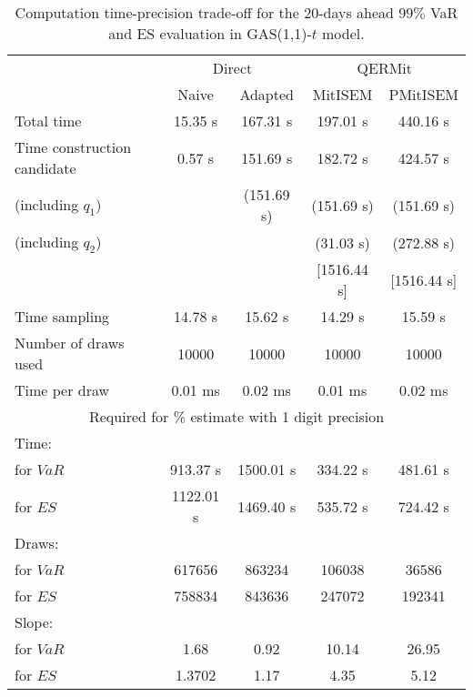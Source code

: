 { \renewcommand{\arraystretch}{1.3} 
\begin{table}[h] 
\centering 
\caption{Computation time-precision trade-off for the 20-days ahead  $99\%$ VaR and ES evaluation in GAS(1,1)-$t$ model.} 
\label{tab:time_precision_t_gas} 
\begin{tabular}{lcccc}  
  & \multicolumn{2}{c}{Direct} & \multicolumn{2}{c}{QERMit}  \\ \cline{2-5} 
  & Naive & Adapted & MitISEM & PMitISEM  \\ \hline 
Total time & 15.35 s & 167.31 s & 197.01 s & 440.16 s \\ 
Time construction candidate & 0.57 s & 151.69 s & 182.72 s & 424.57 s \\ 
 (including $q_{1}$) &   &  (151.69 s) & (151.69 s) & (151.69 s) \\ 
 (including $q_{2}$) &   &  & (31.03 s) & (272.88 s) \\ 
[Initialisation for $q_{2}$]&   &   & [1516.44 s] & [1516.44 s] \\ 
Time sampling & 14.78 s & 15.62 s & 14.29 s & 15.59 s  \\  
Number of draws used & 10000 & 10000 & 10000 & 10000 \\ 
Time per draw & 0.01 ms & 0.02 ms & 0.01 ms & 0.02 ms \\ \hline 
\multicolumn{5}{c}{Required for \% estimate with 1 digit precision} \\ \hline 
Time: &  &  &   &  \\ 
\hspace{1cm} for $VaR$ & 913.37 s & 1500.01 s & 334.22 s & 481.61 s \\ 
\hspace{1cm} for $ES$ & 1122.01 s & 1469.40 s & 535.72 s & 724.42 s \\ 
Draws: &  &  &   &  \\ 
\hspace{1cm} for $VaR$ & 617656 & 863234  & 106038  &  36586  \\ 
\hspace{1cm} for $ES$ & 758834 & 843636  & 247072   & 192341  \\ 
\hline 
Slope: &  &  &   &  \\ 
\hspace{1cm} for $VaR$ & 1.68 & 0.92  & 10.14  & 26.95  \\ 
\hspace{1cm} for $ES$ & 1.3702 & 1.17  & 4.35   & 5.12  \\  \hline 
\end{tabular} 
\end{table} 
} 
